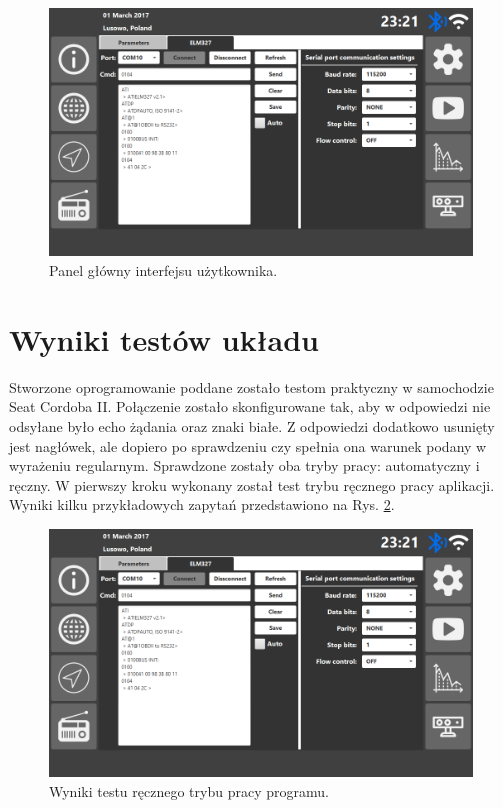 \documentclass[12pt]{article} %
\numberwithin{equation}{subsection}
\numberwithin{figure}{section}
\numberwithin{table}{section}
\begin{document}
		\begin{figure}[!h]
			\centering
			\includegraphics[scale=0.55]{Images/user_interface_settings_elm_tab.png}
			\caption{Panel główny interfejsu użytkownika.}
			\label{user_interface_dashboard}
		\end{figure}
	
	
	\newpage
	
	\section{Wyniki testów układu}	
	
	\hspace{0.5cm}Stworzone oprogramowanie poddane zostało testom praktyczny w samochodzie Seat Cordoba II. Połączenie zostało skonfigurowane tak, aby w odpowiedzi nie odsyłane było echo żądania oraz znaki białe. Z odpowiedzi dodatkowo usunięty jest nagłówek, ale dopiero po sprawdzeniu czy spełnia ona warunek podany w wyrażeniu regularnym. Sprawdzone zostały oba tryby pracy: automatyczny i ręczny. W pierwszy kroku wykonany został test trybu ręcznego pracy aplikacji. Wyniki kilku przykładowych zapytań przedstawiono na Rys. \ref{rys_wyniki_testu_recznego}.
	
		\begin{figure}[!h]
			\centering
			\includegraphics[scale=0.55]{Images/user_interface_settings_elm_tab.png}
			\caption{Wyniki testu ręcznego trybu pracy programu.}
			\label{rys_wyniki_testu_recznego}
		\end{figure}
	
\end{document}
